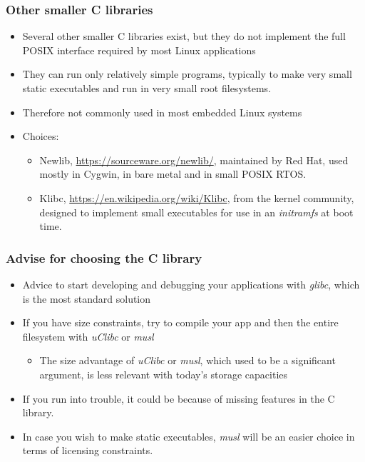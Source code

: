 \begin{frame}
  \frametitle{Other smaller C libraries}
  \begin{itemize}
  \item Several other smaller C libraries exist, but they do not
    implement the full POSIX interface required by most Linux
    applications
  \item They can run only relatively simple programs, typically to
    make very small static executables and run in very small root
    filesystems.
  \item Therefore not commonly used in most embedded Linux systems
  \item Choices:
    \begin{itemize}
    \item Newlib, \url{https://sourceware.org/newlib/}, maintained by
      Red Hat, used mostly in Cygwin, in bare metal and in small POSIX
      RTOS.
    \item Klibc, \url{https://en.wikipedia.org/wiki/Klibc}, from the
      kernel community, designed to implement small executables for
      use in an {\em initramfs} at boot time.
    \end{itemize}
  \end{itemize}
\end{frame}

\begin{frame}
  \frametitle{Advise for choosing the C library}
  \begin{itemize}
  \item Advice to start developing and debugging your applications
    with {\em glibc}, which is the most standard solution
  \item If you have size constraints, try to compile your app and then
    the entire filesystem with {\em uClibc} or {\em musl}
    \begin{itemize}
    \item The size advantage of {\em uClibc} or {\em musl}, which used
      to be a significant argument, is less relevant with today's
      storage capacities
    \end{itemize}
  \item If you run into trouble, it could be because of missing
    features in the C library.
  \item In case you wish to make static executables, {\em musl} will
    be an easier choice in terms of licensing constraints.
  \end{itemize}
\end{frame}

